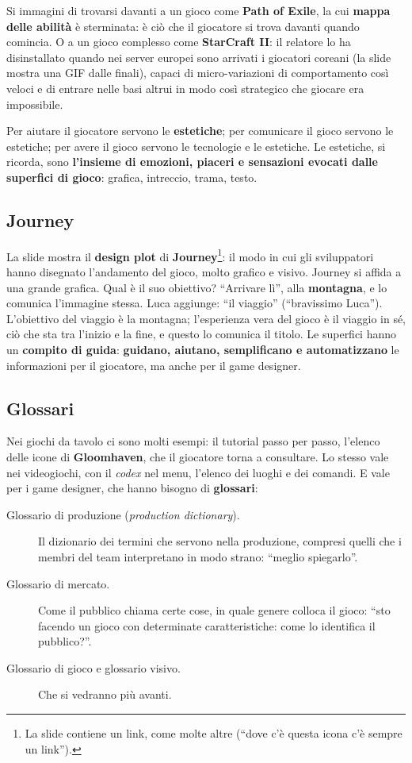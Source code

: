 Si immagini di trovarsi davanti a un gioco come \textbf{Path of Exile}, la cui
\textbf{mappa delle abilità} è sterminata: è ciò che il giocatore si trova
davanti quando comincia. O a un gioco complesso come \textbf{StarCraft II}: il
relatore lo ha disinstallato quando nei server europei sono arrivati i giocatori
coreani (la slide mostra una GIF dalle finali), capaci di micro-variazioni di
comportamento così veloci e di entrare nelle basi altrui in modo così strategico
che giocare era impossibile.

Per aiutare il giocatore servono le \textbf{estetiche}; per comunicare il gioco
servono le estetiche; per avere il gioco servono le tecnologie e le estetiche.
Le estetiche, si ricorda, sono \textbf{l'insieme di emozioni, piaceri e
sensazioni evocati dalle superfici di gioco}: grafica, intreccio, trama, testo.

\subsection{Journey}

La slide mostra il \textbf{design plot} di \textbf{Journey}\footnote{La slide
contiene un link, come molte altre (``dove c'è questa icona c'è sempre un
link'').}: il modo in cui gli sviluppatori hanno disegnato l'andamento del
gioco, molto grafico e visivo. Journey si affida a una grande grafica. Qual è il
suo obiettivo? ``Arrivare lì'', alla \textbf{montagna}, e lo comunica l'immagine
stessa. Luca aggiunge: ``il viaggio'' (``bravissimo Luca''). L'obiettivo del
viaggio è la montagna; l'esperienza vera del gioco è il viaggio in sé, ciò che
sta tra l'inizio e la fine, e questo lo comunica il titolo. Le superfici hanno
un \textbf{compito di guida}: \textbf{guidano, aiutano, semplificano e
automatizzano} le informazioni per il giocatore, ma anche per il game designer.

\subsection{Glossari}

Nei giochi da tavolo ci sono molti esempi: il tutorial passo per passo, l'elenco
delle icone di \textbf{Gloomhaven}, che il giocatore torna a consultare. Lo
stesso vale nei videogiochi, con il \emph{codex} nel menu, l'elenco dei luoghi e
dei comandi. E vale per i game designer, che hanno bisogno di
\textbf{glossari}:
\begin{description}
  \item[Glossario di produzione (\emph{production dictionary}).] Il dizionario dei
        termini che servono nella produzione, compresi quelli che i membri del
        team interpretano in modo strano: ``meglio spiegarlo''.
  \item[Glossario di mercato.] Come il pubblico chiama certe cose, in quale
        genere colloca il gioco: ``sto facendo un gioco con determinate
        caratteristiche: come lo identifica il pubblico?''.
  \item[Glossario di gioco e glossario visivo.] Che si vedranno più avanti.
\end{description}

